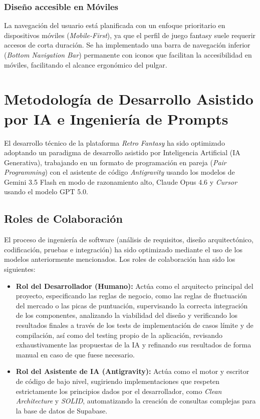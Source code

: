 \subsubsection{Diseño accesible en Móviles}
La navegación del usuario está planificada con un enfoque prioritario en dispositivos móviles (\textit{Mobile-First}), ya que el perfil de juego fantasy suele requerir accesos de corta duración. Se ha implementado una barra de navegación inferior (\textit{Bottom Navigation Bar}) permanente con iconos que facilitan la accesibilidad en móviles, facilitando el alcance ergonómico del pulgar.


\section{Metodología de Desarrollo Asistido por IA e Ingeniería de Prompts}
\label{sec:ia_prompts_detalle}

El desarrollo técnico de la plataforma \textit{Retro Fantasy} ha sido optimizado adoptando un paradigma de desarrollo asistido por Inteligencia Artificial (IA Generativa), trabajando en un formato de programación en pareja (\textit{Pair Programming}) con el asistente de código \textit{Antigravity} usando los modelos de Gemini 3.5 Flash en modo de razonamiento alto, Claude Opus 4.6 y \textit{Cursor} usando el modelo GPT 5.0.

\subsection{Roles de Colaboración}
El proceso de ingeniería de software (análisis de requisitos, diseño arquitectónico, codificación, pruebas e integración) ha sido optimizado mediante el uso de los modelos anteriormente mencionados. Los roles de colaboración han sido los siguientes:
\begin{itemize}
    \item \textbf{Rol del Desarrollador (Humano):} Actúa como el arquitecto principal del proyecto, especificando las reglas de negocio, como las reglas de fluctuación del mercado o las picas de puntuación, supervisando la correcta integración de los componentes, analizando la viabilidad del diseño y verificando los resultados finales a través de los tests de implementación de casos límite y de compilación, así como del testing propio de la aplicación, revisando exhaustivamente las propuestas de la IA y refinando sus resultados de forma manual en caso de que fuese necesario.
    \item \textbf{Rol del Asistente de IA (Antigravity):} Actúa como el motor y escritor de código de bajo nivel, sugiriendo implementaciones que respeten estrictamente los principios dados por el desarrollador, como \textit{Clean Architecture} y \textit{SOLID}, automatizando la creación de consultas complejas para la base de datos de Supabase.
\end{itemize}


